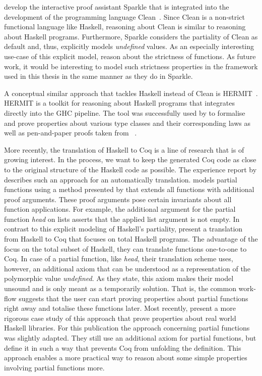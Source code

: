 \citet{demol2002theorem} develop the interactive proof assistant Sparkle that is integrated into the development of  the programming language Clean~\citep{brus1987clean}.
Since Clean is a non-strict functional language like Haskell, reasoning about Clean is similar to reasoning about Haskell programs.
Furthermore, Sparkle considers the partiality of Clean as default and, thus, explicitly models \emph{undefined} values.
As an especially interesting use-case of this explicit model, \citet{vaneekelen2006proof} reason about the strictness of functions.
As future work, it would be interesting to model such strictness properties in the framework used in this thesis in the same manner as they do in Sparkle.

A conceptual similar approach that tackles Haskell instead of Clean is HERMIT~\citep{farmer2015reasoning}.
HERMIT is a toolkit for reasoning about Haskell programs that integrates directly into the GHC pipeline.
The tool was successfully used by \citeauthor{farmer2015reasoning} to formalise and prove properties about various type classes and their corresponding laws as well as pen-and-paper proofs taken from ~\citep{bird2010pearls}.

More recently, the translation of Haskell to Coq is a line of research that is of growing interest.
In the process, we want to keep the generated Coq code as close to the original structure of the Haskell code as possible.
The experience report by \citet{dijkstra2012experimentation} describes such an approach for an automatically translation.
\citeauthor{dijkstra2012experimentation} models partial functions using a method presented by \citet{bove2007computation} that extends all functions with additional proof arguments.
These proof arguments pose certain invariants about all function applications.
For example, the additional argument for the partial function \emph{head} on lists asserts that the applied list argument is not empty.
In contrast to this explicit modeling of Haskell's partiality, \citet{spector-zabusky2018total} present a translation from Haskell to Coq that focuses on total Haskell programs.
The advantage of the focus on the total subset of Haskell, they can translate functions one-to-one to Coq.
In case of a partial function, like \emph{head}, their translation scheme uses, however, an additional axiom that can be understood as a representation of the polymorphic value \emph{undefined}.
As they state, this axiom makes their model unsound and is only meant as a temporarily solution.
That is, the common work-flow suggests that the user can start proving properties about partial functions right away and totalise these functions later.
Most recently, \citet{breitner2018ready} present a more rigorous case study of this approach that prove properties about real world Haskell libraries.
For this publication the approach concerning partial functions was slightly adapted.
They still use an additional axiom for partial functions, but define it in such a way that prevents Coq from unfolding the definition.
This approach enables a more practical way to reason about some simple properties involving partial functions more.

